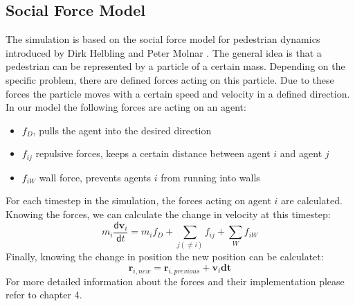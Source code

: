 \documentclass[11pt]{article}
\begin{document}
\subsection{Social Force Model }
The simulation is based on the social force model for pedestrian dynamics introduced by Dirk Helbling and Peter Molnar \cite{Helbling}.
The general idea is that a pedestrian can be represented by a particle of a certain mass. Depending on the specific problem, there are defined forces acting on this particle. Due to these forces the particle  moves with a certain speed and velocity in a defined direction.
In our model the following forces are acting on an agent: 
\begin{itemize}
\item $f_{D}$, pulls the agent into the desired direction
\item $f_{ij}$ repulsive forces, keeps a certain distance between agent $i$ and agent $j$
\item $f_{iW}$ wall force, prevents agents $i$ from running into walls
\end{itemize}
For each timestep in the simulation, the forces acting on agent $i$ are calculated. 
Knowing the forces, we can calculate the change in velocity at this timestep:
\begin{equation}
m_{i}\frac{\mathsf{d}\mathbf{v}_{i}}{\mathsf{d}t}=m_{i}f_{D}+\sum \limits_{j(\neq{i})}{f_{ij}}+\sum \limits_{W}{f_{iW}}
\end{equation}
Finally, knowing the change in position the new position can be calculatet:
\begin{equation}
\mathbf{r}_{i,new}=\mathbf{r}_{i,previous}+\mathbf{v}_{i}\mathbf{dt}
\end{equation}
For more detailed information about the forces and their implementation please refer to \cite{Building}chapter 4.
\end{document}
